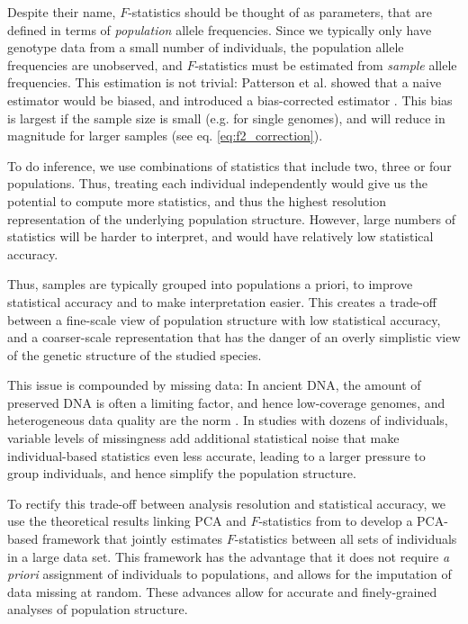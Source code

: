 \documentclass[12pt]{article}
\begin{document}
Despite their name, $F$-statistics should be thought of as parameters, that are defined in terms of \textit{population} allele frequencies. Since we typically only have genotype data from a small number of individuals, the population allele frequencies are unobserved, and $F$-statistics must be estimated from \emph{sample} allele frequencies. This estimation is not trivial: Patterson et al. showed that a naive estimator would be biased, and introduced a bias-corrected estimator \citep{patterson_ancient_2012}. This bias is largest if the sample size is small (e.g. for single genomes), and will reduce in magnitude for larger samples (see eq. \ref{eq:f2_correction}). 

To do inference, we use combinations of statistics that include two, three or four populations. Thus, treating each individual independently would give us the potential to compute more statistics, and thus the highest resolution representation of the underlying population structure. However, large numbers of statistics will be harder to interpret, and would have relatively low statistical accuracy. 

Thus, samples are typically grouped into populations a priori, to improve statistical accuracy and to make interpretation easier. This creates a trade-off between a fine-scale view of population structure with low statistical accuracy, and a coarser-scale representation that has the danger of an overly simplistic view of the genetic structure of the studied species.

This issue is compounded by missing data: In ancient DNA, the amount of preserved DNA is often a limiting factor, and hence low-coverage genomes, and heterogeneous data quality are the norm \citep{orlando_ancient_2021}. In studies with dozens of individuals, variable levels of missingness add additional statistical noise that make individual-based statistics even less accurate, leading to a larger pressure to group individuals, and hence simplify the population structure. 

To rectify this trade-off between analysis resolution and statistical accuracy, we use the theoretical results linking PCA and $F$-statistics from \cite{peter_geometric_2022} to develop a PCA-based framework that jointly estimates $F$-statistics between all sets of individuals in a large data set. This framework has the advantage that it does not require \textit{a priori} assignment of individuals to populations, and allows for the imputation of data missing at random. These advances allow for accurate and finely-grained analyses of population structure.
\end{document}
